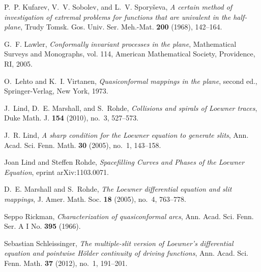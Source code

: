 \documentclass[11pt]{amsart}
\numberwithin{equation}{section}
\theoremstyle{plain}
\theoremstyle{definition}
\begin{document}
\begin{thebibliography}{1}

P.~P. Kufarev, V.~V. Sobolev, and L.~V. Spory{\v{s}}eva, \emph{A certain method
  of investigation of extremal problems for functions that are univalent in the
  half-plane}, Trudy Tomsk. Gos. Univ. Ser. Meh.-Mat. \textbf{200} (1968),
  142--164.

G.~F. Lawler, \emph{Conformally invariant processes in the plane}, Mathematical
  Surveys and Monographs, vol. 114, American Mathematical Society, Providence,
  RI, 2005.

O.~Lehto and K.~I. Virtanen, \emph{Quasiconformal mappings in the plane},
  second ed., Springer-Verlag, New York, 1973.

J.~Lind, D.~E. Marshall, and S.~Rohde, \emph{Collisions and spirals of
  {L}oewner traces}, Duke Math. J. \textbf{154} (2010), no.~3, 527--573.

J.~R. Lind, \emph{A sharp condition for the {L}oewner equation to generate
  slits}, Ann. Acad. Sci. Fenn. Math. \textbf{30} (2005), no.~1, 143--158.

Joan Lind and Steffen Rohde, \emph{Spacefilling {C}urves and {P}hases of the
  {L}oewner {E}quation}, eprint arXiv:1103.0071.

D.~E. Marshall and S.~Rohde, \emph{The {L}oewner differential equation and slit
  mappings}, J. Amer. Math. Soc. \textbf{18} (2005), no.~4, 763--778.

Seppo Rickman, \emph{Characterization of quasiconformal arcs}, Ann. Acad. Sci.
  Fenn. Ser. A I No. \textbf{395} (1966).

Sebastian Schleissinger, \emph{The multiple-slit version of {L}oewner's
  differential equation and pointwise {H}\"older continuity of driving
  functions}, Ann. Acad. Sci. Fenn. Math. \textbf{37} (2012), no.~1, 191--201.

\end{thebibliography}
\end{document}

